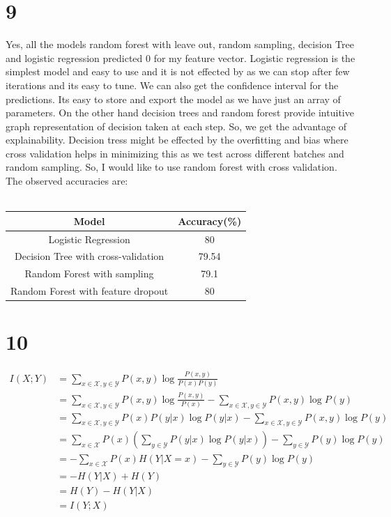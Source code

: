 \documentclass{article}
\begin{document}
\section{9}
Yes, all the models random forest with leave out, random sampling, decision Tree and logistic regression predicted 0 for my feature vector. 
Logistic regression is the simplest model and easy to use and it is not effected by  as we can stop after few iterations and its easy to tune. We can also get the confidence interval for the predictions. Its easy to store and export the model  as we have just an array of parameters.
On the other hand decision trees and random forest provide intuitive graph representation of decision taken at each step. So, we get the advantage of explainability. Decision tress might be effected by the overfitting and bias where cross validation helps in minimizing this as we test across different batches and random sampling. So, I would like to use random forest with cross validation.
The observed accuracies are: \\
\\
\begin{center}
    \begin{tabular}{|c|c|} 
\hline
Model & Accuracy(\%)\\
\hline %
Logistic Regression & 80\\ %
\hline %
Decision Tree with cross-validation& 79.54\\
\hline
Random Forest with sampling& 79.1\\
\hline
Random Forest with feature dropout& 80\\
\hline
\end{tabular}
\end{center}
\section{10}
\begin{align*}
    I(X;Y) &= \sum_{x \in \mathcal{X}, y \in \mathcal{Y}} P(x,y) \log \frac{P(x,y)}{P(x)P(y)} \\
&= \sum_{x \in \mathcal{X}, y \in \mathcal{Y}} P(x,y) \log \frac{P(x,y)}{P(x)} - \sum_{x \in \mathcal{X}, y \in \mathcal{Y}} P(x,y) \log P(y) \\
&= \sum_{x \in \mathcal{X}, y \in \mathcal{Y}} P(x)P(y|x) \log P(y|x) - \sum_{x \in \mathcal{X}, y \in \mathcal{Y}} P(x,y) \log P(y) \\
&= \sum_{x \in \mathcal{X}} P(x) \left( \sum_{y \in \mathcal{Y}} P(y|x) \log P(y|x) \right) - \sum_{y \in \mathcal{Y}} P(y) \log P(y) \\
&= - \sum_{x \in \mathcal{X}} P(x) H(Y | X = x) - \sum_{y \in \mathcal{Y}} P(y) \log P(y) \\
&= - H(Y | X) + H(Y) \\
&= H(Y) - H(Y|X) \\
&= I(Y;X)
\end{align*}
\end{document}
